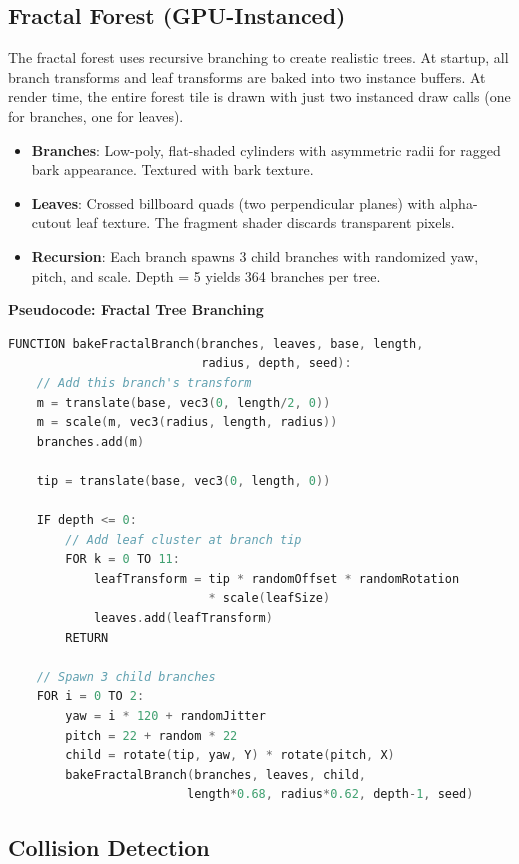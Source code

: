 \documentclass[12pt,a4paper]{article}
\begin{document}
\subsection{Fractal Forest (GPU-Instanced)}

The fractal forest uses recursive branching to create realistic trees. At startup, all branch transforms and leaf transforms are baked into two instance buffers. At render time, the entire forest tile is drawn with just two instanced draw calls (one for branches, one for leaves).

\begin{itemize}
    \item \textbf{Branches}: Low-poly, flat-shaded cylinders with asymmetric radii for ragged bark appearance. Textured with bark texture.
    \item \textbf{Leaves}: Crossed billboard quads (two perpendicular planes) with alpha-cutout leaf texture. The fragment shader discards transparent pixels.
    \item \textbf{Recursion}: Each branch spawns 3 child branches with randomized yaw, pitch, and scale. Depth = 5 yields 364 branches per tree.
\end{itemize}

\textbf{Pseudocode: Fractal Tree Branching}
\begin{lstlisting}[language=C++, caption={Recursive Fractal Tree}]
FUNCTION bakeFractalBranch(branches, leaves, base, length,
                           radius, depth, seed):
    // Add this branch's transform
    m = translate(base, vec3(0, length/2, 0))
    m = scale(m, vec3(radius, length, radius))
    branches.add(m)

    tip = translate(base, vec3(0, length, 0))

    IF depth <= 0:
        // Add leaf cluster at branch tip
        FOR k = 0 TO 11:
            leafTransform = tip * randomOffset * randomRotation
                            * scale(leafSize)
            leaves.add(leafTransform)
        RETURN

    // Spawn 3 child branches
    FOR i = 0 TO 2:
        yaw = i * 120 + randomJitter
        pitch = 22 + random * 22
        child = rotate(tip, yaw, Y) * rotate(pitch, X)
        bakeFractalBranch(branches, leaves, child,
                         length*0.68, radius*0.62, depth-1, seed)
\end{lstlisting}

\subsection{Collision Detection}
\end{document}
